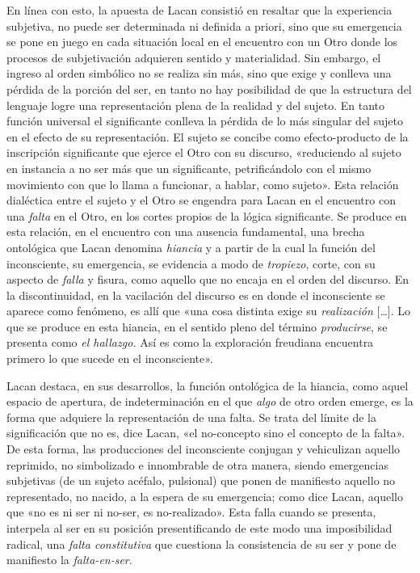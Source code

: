 En línea con esto, la apuesta de Lacan consistió en resaltar que la experiencia subjetiva, no puede ser determinada ni definida a priori, sino que su emergencia se pone en juego en cada situación local en el encuentro con un Otro donde los procesos de subjetivación adquieren sentido y materialidad. Sin embargo, el ingreso al orden simbólico no se realiza sin más, sino que exige y conlleva una pérdida de la porción del ser, en tanto no hay posibilidad de que la estructura del lenguaje logre una representación plena de la realidad y del sujeto. En tanto función universal el significante conlleva la pérdida de lo más singular del sujeto en el efecto de su representación. El sujeto se concibe como efecto-producto de la inscripción significante que ejerce el Otro con su discurso, «reduciendo al sujeto en instancia a no ser más que un significante, petrificándolo con el mismo movimiento con que lo llama a funcionar, a hablar, como sujeto». Esta relación dialéctica entre el sujeto y el Otro se engendra para Lacan en el encuentro con una \emph{falta} en el Otro, en los cortes propios de la lógica significante. Se produce en esta relación, en el encuentro con una ausencia fundamental, una brecha ontológica que Lacan denomina \emph{hiancia }y a partir de la cual la función del inconsciente, su emergencia, se evidencia a modo de \emph{tropiezo}, corte, con su aspecto de \emph{falla} y fisura, como aquello que no encaja en el orden del discurso. En la discontinuidad, en la vacilación del discurso es en donde el inconsciente se aparece como fenómeno, es allí que «una cosa distinta exige su \emph{realización} {[}\ldots{]}. Lo que se produce en esta hiancia, en el sentido pleno del término \emph{producirse}, se presenta como \emph{el hallazgo. }Así es como la exploración freudiana encuentra primero lo que sucede en el inconsciente».

Lacan destaca, en sus desarrollos, la función ontológica de la hiancia, como aquel espacio de apertura, de indeterminación en el que \emph{algo} de otro orden emerge, es la forma que adquiere la representación de una falta. Se trata del límite de la significación que no es, dice Lacan, «el no-concepto sino el concepto de la falta». De esta forma, las producciones del inconsciente conjugan y vehiculizan aquello reprimido, no simbolizado e innombrable de otra manera, siendo emergencias subjetivas (de un sujeto acéfalo, pulsional) que ponen de manifiesto aquello no representado, no nacido, a la espera de su emergencia; como dice Lacan, aquello que «no es ni ser ni no-ser, es no-realizado». Esta falla cuando se presenta, interpela al ser en su posición presentificando de este modo una imposibilidad radical, una \emph{falta constitutiva} que cuestiona la consistencia de su ser y pone de manifiesto la \emph{falta-en-ser}.

